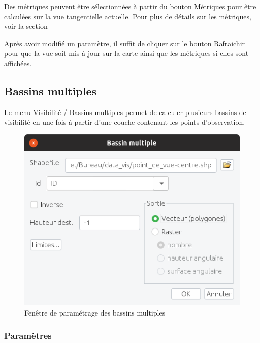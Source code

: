 \documentclass{report}
\begin{document}
Des métriques peuvent être sélectionnées à partir du bouton Métriques pour être calculées sur la vue tangentielle actuelle. Pour plus de détails sur les métriques, voir la section 

Après avoir modifié un paramètre, il suffit de cliquer sur le bouton Rafraichir pour que la vue soit mis à jour sur la carte ainsi que les métriques si elles sont affichées.

\subsection{Bassins multiples}
\label{multi_viewshed}
Le menu Visibilité / Bassins multiples permet de calculer plusieurs bassins de visibilité en une fois à partir d'une couche contenant les points d'observation.

\begin{figure}[H]
	\includegraphics[scale=0.5]{img/multi_viewshed-fr.png} 
	\caption{Fenêtre de paramétrage des bassins multiples}
	\label{multi_viewshed_dlg}
\end{figure}

\subsubsection{Paramètres}
\end{document}
